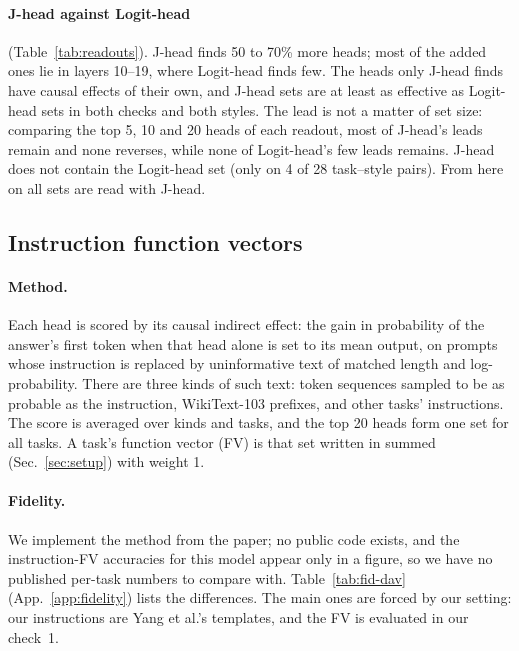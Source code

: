 \documentclass[10pt,a4paper]{article}
\begin{document}
\paragraph{J-head against Logit-head} (Table~\ref{tab:readouts}). J-head finds 50 to 70\% more heads; most of the added ones lie in layers 10--19, where Logit-head finds few. The heads only J-head finds have causal effects of their own, and J-head sets are at least as effective as Logit-head sets in both checks and both styles. The lead is not a matter of set size: comparing the top 5, 10 and 20 heads of each readout, most of J-head's leads remain and none reverses, while none of Logit-head's few leads remains. J-head does not contain the Logit-head set (only on 4 of 28 task--style pairs). From here on all sets are read with J-head.

\begin{table}[H]
\centering\small

\caption{Lexical task heads under both readouts (items not held out). Heads: summed over the 14 tasks. Effect: highest accuracy over the 15 values of $\alpha$, averaged over the style's five means, minus unpatched accuracy; mean over tasks. J only: heads J-head finds and Logit-head does not.}
\label{tab:readouts}
\end{table}

\subsection{\texorpdfstring{Instruction function vectors \citep{davidson2025different}}{Instruction function vectors (Davidson et al., 2025)}}

\paragraph{Method.} Each head is scored by its causal indirect effect: the gain in probability of the answer's first token when that head alone is set to its mean output, on prompts whose instruction is replaced by uninformative text of matched length and log-probability. There are three kinds of such text: token sequences sampled to be as probable as the instruction, WikiText-103 prefixes, and other tasks' instructions. The score is averaged over kinds and tasks, and the top 20 heads form one set for all tasks. A task's function vector (FV) is that set written in summed (Sec.~\ref{sec:setup}) with weight 1.

\paragraph{Fidelity.} We implement the method from the paper; no public code exists, and the instruction-FV accuracies for this model appear only in a figure, so we have no published per-task numbers to compare with. Table~\ref{tab:fid-dav} (App.~\ref{app:fidelity}) lists the differences. The main ones are forced by our setting: our instructions are Yang et al.'s templates, and the FV is evaluated in our check~1.
\end{document}
